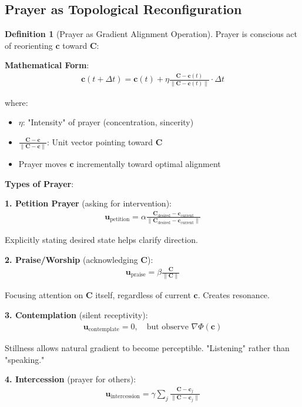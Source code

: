 \documentclass[11pt,a4paper]{article}
\theoremstyle{definition}
\newtheorem{definition}{Definition}[section]
\theoremstyle{remark}
\newcommand{\cc}{\mathbf{c}}
\begin{document}
\begin{small}
\begin{enumerate}
\begin{protocol}
\subsection{Prayer as Topological Reconfiguration}

\begin{definition}[Prayer as Gradient Alignment Operation]
Prayer is conscious act of reorienting \(\cc\) toward \(\mathbf{C}\):

\textbf{Mathematical Form}:
\begin{align}
\cc(t + \Delta t) = \cc(t) + \eta \frac{\mathbf{C} - \cc(t)}{\|\mathbf{C} - \cc(t)\|} \cdot \Delta t
\end{align}

where:
\begin{itemize}
    \item \(\eta\): "Intensity" of prayer (concentration, sincerity)
    \item \(\frac{\mathbf{C} - \cc}{\|\mathbf{C} - \cc\|}\): Unit vector pointing toward \(\mathbf{C}\)
    \item Prayer moves \(\cc\) incrementally toward optimal alignment
\end{itemize}

\textbf{Types of Prayer}:

\textbf{1. Petition Prayer} (asking for intervention):
\begin{align}
\mathbf{u}_{\text{petition}} = \alpha \frac{\mathbf{C}_{\text{desired}} - \cc_{\text{current}}}{\|\mathbf{C}_{\text{desired}} - \cc_{\text{current}}\|}
\end{align}

Explicitly stating desired state helps clarify direction.

\textbf{2. Praise/Worship} (acknowledging \(\mathbf{C}\)):
\begin{align}
\mathbf{u}_{\text{praise}} = \beta \frac{\mathbf{C}}{\|\mathbf{C}\|}
\end{align}

Focusing attention on \(\mathbf{C}\) itself, regardless of current \(\cc\). Creates resonance.

\textbf{3. Contemplation} (silent receptivity):
\begin{align}
\mathbf{u}_{\text{contemplate}} = 0, \quad \text{but observe } \nabla \Phi(\cc)
\end{align}

Stillness allows natural gradient to become perceptible. "Listening" rather than "speaking."

\textbf{4. Intercession} (prayer for others):
\begin{align}
\mathbf{u}_{\text{intercession}} = \gamma \sum_j \frac{\mathbf{C} - \cc_j}{\|\mathbf{C} - \cc_j\|}
\end{align}


\end{definition}
\end{protocol}
\end{enumerate}
\end{small}
\end{document}
